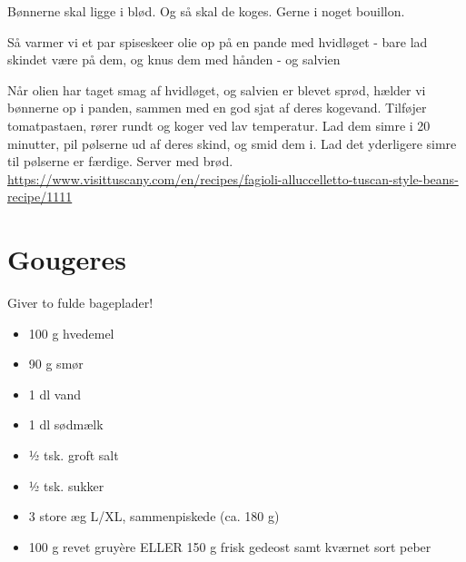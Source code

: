 \documentclass[
]{book}
\providecommand{\tightlist}{%
  \setlength{\itemsep}{0pt}\setlength{\parskip}{0pt}}
\begin{document}
Bønnerne skal ligge i blød. Og så skal de koges. Gerne i noget bouillon.

Så varmer vi et par spiseskeer olie op på en pande med hvidløget -
bare lad skindet være på dem, og knus dem med hånden - og salvien

Når olien har taget smag af hvidløget, og salvien er blevet sprød,
hælder vi bønnerne op i panden, sammen med en god sjat af deres kogevand.
Tilføjer tomatpastaen, rører rundt og koger ved lav temperatur. Lad dem
simre i 20 minutter, pil pølserne ud af deres skind, og smid dem i. Lad det yderligere
simre til pølserne er færdige. Server med brød.
\url{https://www.visittuscany.com/en/recipes/fagioli-alluccelletto-tuscan-style-beans-recipe/1111}

\section{Gougeres}\label{gougeres}

Giver to fulde bageplader!

\begin{itemize}
\tightlist
\item
  100 g hvedemel
\item
  90 g smør
\item
  1 dl vand
\item
  1 dl sødmælk
\item
  1⁄2 tsk. groft salt
\item
  1⁄2 tsk. sukker
\item
  3 store æg L/XL, sammenpiskede (ca. 180 g)
\item
  100 g revet gruyère ELLER 150 g frisk gedeost samt kværnet sort peber
\end{itemize}
\end{document}
